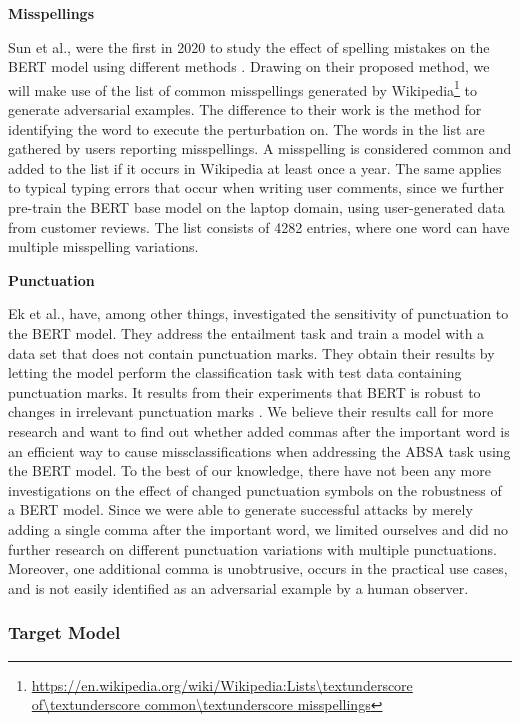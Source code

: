\textbf{Misspellings}

Sun et al., were the first in 2020 to study the effect of spelling mistakes on the BERT model using different methods \cite{sun2020adv}. Drawing on their proposed method, we will make use of the list of common misspellings generated by Wikipedia\footnote{\url{https://en.wikipedia.org/wiki/Wikipedia:Lists\textunderscore of\textunderscore common\textunderscore misspellings}} to generate adversarial examples. The difference to their work is the method for identifying the word to execute the perturbation on. 
The words in the list are gathered by users reporting misspellings. A misspelling is considered common and added to the list if it occurs in Wikipedia at least once a year. The same applies to typical typing errors that occur when writing user comments, since we further pre-train the BERT base model on the laptop domain, using user-generated data from customer reviews. 
The list consists of 4282 entries, where one word can have multiple misspelling variations. 

\textbf{Punctuation}

Ek et al., have, among other things, investigated the sensitivity of punctuation to the BERT model. They address the entailment task and train a model with a data set that does not contain punctuation marks. They obtain their results by letting the model perform the classification task with test data containing punctuation marks. It results from their experiments that BERT is robust to changes in irrelevant punctuation marks \cite{ekdoes}. We believe their results call for more research and want to find out whether added commas after the important word is an efficient way to cause missclassifications when addressing the ABSA task using the BERT model. 
To the best of our knowledge, there have not been any more investigations on the effect of changed punctuation symbols on the robustness of a BERT model. Since we were able to generate successful attacks by merely adding a single comma after the important word, we limited ourselves and did no further research on different punctuation variations with multiple punctuations. Moreover, one additional comma is unobtrusive, occurs in the practical use cases, and is not easily identified as an adversarial example by a human observer.

\subsubsection{Target Model} 
\label{sec:target_model_method}

